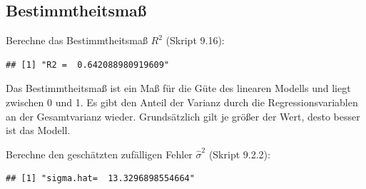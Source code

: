 \documentclass[]{article}
\newenvironment{Shaded}{\begin{snugshade}}{\end{snugshade}}
\newcommand{\DecValTok}[1]{\textcolor[rgb]{0.00,0.00,0.81}{#1}}
\newcommand{\KeywordTok}[1]{\textcolor[rgb]{0.13,0.29,0.53}{\textbf{#1}}}
\newcommand{\NormalTok}[1]{#1}
\newcommand{\OperatorTok}[1]{\textcolor[rgb]{0.81,0.36,0.00}{\textbf{#1}}}
\newcommand{\StringTok}[1]{\textcolor[rgb]{0.31,0.60,0.02}{#1}}
\begin{document}
\hypertarget{bestimmtheitsmauxdf}{%
\subsection{Bestimmtheitsmaß}\label{bestimmtheitsmauxdf}}

Berechne das Bestimmtheitsmaß \(R^2\) (Skript 9.16):

\begin{Shaded}
\end{Shaded}

\begin{verbatim}
## [1] "R2 =  0.642088980919609"
\end{verbatim}

Das Bestimmtheitsmaß ist ein Maß für die Güte des linearen Modells und liegt zwischen 0 und 1.
Es gibt den Anteil der Varianz durch die Regressionsvariablen an der Gesamtvarianz wieder. Grundsätzlich gilt je größer der Wert,
desto besser ist das Modell.

Berechne den geschätzten zufälligen Fehler \(\hat\sigma^2\) (Skript 9.2.2):

\begin{Shaded}
\end{Shaded}

\begin{verbatim}
## [1] "sigma.hat=  13.3296898554664"
\end{verbatim}
\end{document}
